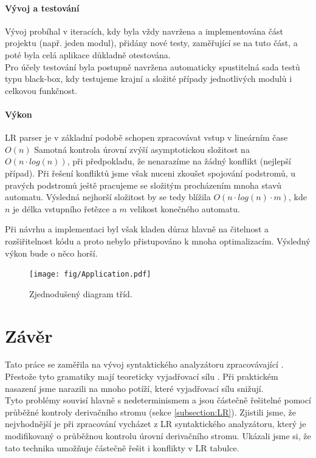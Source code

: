 \subsubsection*{Vývoj a testování}

Vývoj probíhal v iteracích, kdy byla vždy navržena a implementována část
projektu (např. jeden modul), přidány nové testy, zaměřující se na
tuto část, a poté byla celá aplikace důkladně otestována.\\

Pro účely testování byla postupně navržena automaticky spustitelná sada testů
typu black-box, kdy testujeme krajní a složité případy jednotlivých modulů
i celkovou funkčnost.

\subsubsection*{Výkon}

LR parser je v základní podobě schopen zpracovávat vstup v lineárním čase $O(n)$
Samotná kontrola úrovní zvýší asymptotickou složitost na $O(n \cdot log(n))$, při
předpokladu, že nenarazíme na žádný konflikt (nejlepší případ).
Při řešení konfliktů jsme však nuceni zkoušet spojování podstromů,
u pravých podstromů ještě pracujeme se složitým procházením mnoha stavů automatu.
Výsledná nejhorší složitost by se tedy blížila $O(n \cdot log(n) \cdot m)$,
kde $n$ je délka vstupního řetězce a $m$ velikost konečného automatu.

Při návrhu a implementaci byl však kladen důraz hlavně na čitelnost a
rozšiřitelnost kódu a proto nebylo přistupováno k mnoha optimalizacím.
Výsledný výkon bude o něco horší.

\begin{figure}[H]
  \centering
  \texttt{[image: fig/Application.pdf]}
  \caption{Zjednodušený diagram tříd.}
\end{figure}


\chapter{Závěr}

Tato práce se zaměřila na vývoj syntaktického analyzátoru zpracovávající
. Přestože tyto gramatiky mají teoreticky vyjadřovací
sílu . Při praktickém nasazení jsme narazili na mnoho
potíží, které vyjadřovací sílu snižují.\\

Tyto problémy souvisí hlavně s nedeterminismem a jsou částečně řešitelné pomocí
průběžné kontroly derivačního stromu (sekce \ref{subsection:LR}).
Zjistili jsme, že nejvhodnější je při zpracování vycházet z LR syntaktického
analyzátoru, který je modifikovaný o průběžnou kontrolu úrovní derivačního stromu.
Ukázali jsme si, že tato technika umožňuje částečně řešit  i
 konflikty v LR tabulce.\\

